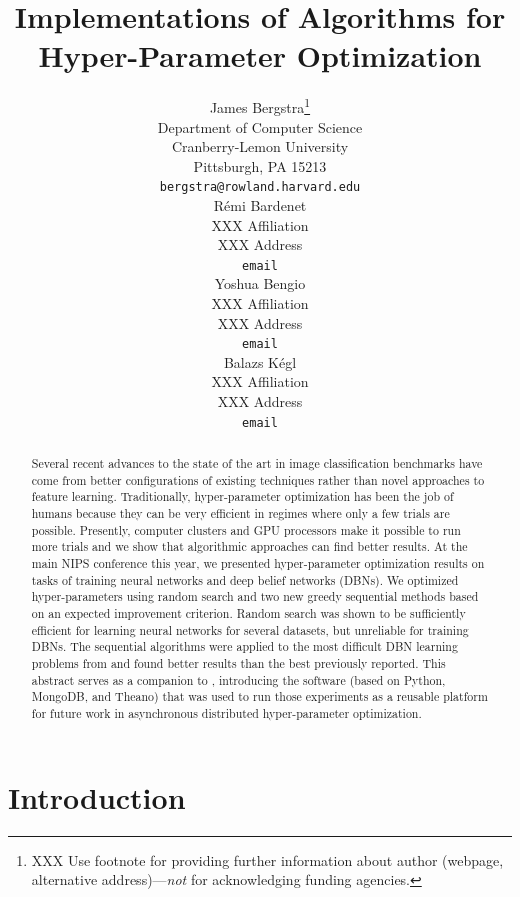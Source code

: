 \documentclass{article}
\title{Implementations of Algorithms for Hyper-Parameter Optimization}
\author{
James Bergstra\thanks{XXX Use footnote for providing further information
about author (webpage, alternative address)---\emph{not} for acknowledging
funding agencies.} \\
Department of Computer Science\\
Cranberry-Lemon University\\
Pittsburgh, PA 15213 \\
\texttt{bergstra@rowland.harvard.edu} \\
\And
R{\'e}mi Bardenet \\
XXX Affiliation \\
XXX Address \\
\texttt{email} \\
\AND
Yoshua Bengio \\
XXX Affiliation \\
XXX Address \\
\texttt{email} \\
\And
Balazs K{\'e}gl \\
XXX Affiliation \\
XXX Address \\
\texttt{email}
}
\newcommand{\vs}[1]{\vspace*{-#1mm}}
\newcommand{\Bs}{\vs{2}}
\newcommand{\as}{\vs{1}}
\begin{document}
\maketitle
\begin{abstract}
\vs{2}
    Several recent advances to the state of the art in image classification benchmarks have come
    from better configurations of existing techniques rather than novel approaches to
    feature learning.
    Traditionally,
    hyper-parameter optimization has been the job of humans because they can be very efficient in regimes where only a few trials are possible.
    Presently, computer clusters and GPU processors make it possible to run more trials
    and we show that algorithmic approaches can find better results.
    At the main NIPS conference this year, we presented hyper-parameter optimization results on tasks of training neural networks and deep belief networks (DBNs).
    We optimized hyper-parameters using random search
    and two new greedy sequential methods based on an expected improvement criterion.
    Random search was shown to be sufficiently efficient for learning neural networks for several datasets,
    but unreliable for training DBNs.
    The sequential algorithms were applied to the most difficult DBN learning problems from
    \cite{Larochelle+etal:2007}
    and found better results than the best previously reported.
    This abstract serves as a companion to \cite{bergstra+bardenet+bengio+kegl:2011},
    introducing the software (based on Python, MongoDB, and Theano)
    that was used to run those experiments as a reusable platform for future work in
    asynchronous distributed hyper-parameter optimization.
\vs{3}
\end{abstract}

\Bs
\section{Introduction}
\as
\end{document}
